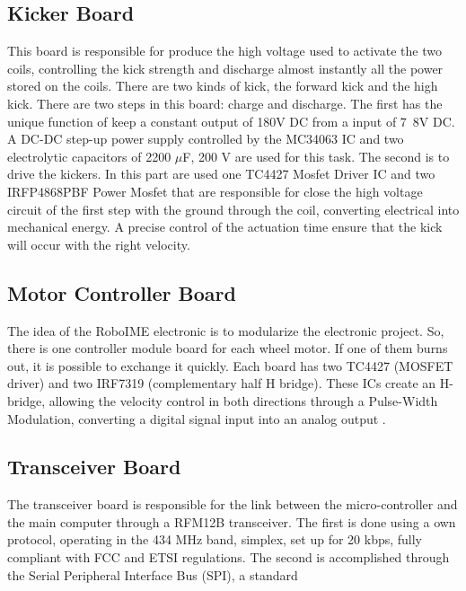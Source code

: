 \subsection{Kicker Board}
This board is responsible for produce the high voltage used to activate the two coils, controlling the kick strength and discharge almost instantly all the power stored on the coils. There are two kinds of kick, the forward kick and the high kick. There are two steps in this board: charge and discharge. The first has the unique function of keep a constant output of 180V DC from a input of 7~8V DC. A DC-DC step-up power supply controlled by the MC34063 IC and two electrolytic capacitors of 2200 $\mu$F, 200 V are used for this task. The second is to drive the kickers. In this part are used one TC4427 Mosfet Driver IC and two IRFP4868PBF Power Mosfet that are responsible for close the high voltage circuit of the first step with the ground through the coil, converting electrical into mechanical energy. A precise control of the actuation time ensure that the kick will occur with the right velocity. 


\subsection{Motor Controller Board}
The idea of the RoboIME electronic is to modularize the electronic project. So, there is one controller module board for each wheel motor. If one of them burns out, it is possible to exchange it quickly. Each board has two TC4427 (MOSFET driver) and two IRF7319 (complementary half H bridge). These ICs create an H-bridge, allowing the velocity control in both directions through a Pulse-Width Modulation, converting a digital signal input into an analog output . 


\subsection{Transceiver Board}
The transceiver board is responsible for the link between the micro-controller and the main computer through a RFM12B transceiver. The first is done using a own protocol, operating in the 434 MHz band, simplex, set up for 20 kbps, fully compliant with FCC and ETSI regulations. The second is accomplished through the Serial Peripheral Interface Bus (SPI), a standard 

